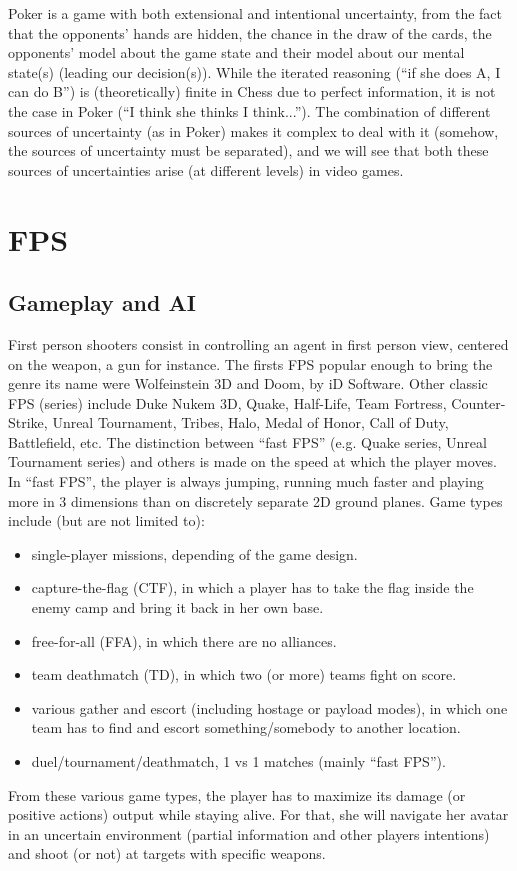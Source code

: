 Poker is a game with both extensional and intentional uncertainty, from the fact that the opponents' hands are hidden, the chance in the draw of the cards, the opponents' model about the game state and their model about our mental state(s) (leading our decision(s)). While the iterated reasoning (``if she does A, I can do B'') is (theoretically) finite in Chess due to perfect information, it is not the case in Poker (``I think she thinks I think...''). The combination of different sources of uncertainty (as in Poker) makes it complex to deal with it (somehow, the sources of uncertainty must be separated), and we will see that both these sources of uncertainties arise (at different levels) in video games.


\section{FPS}

\subsection{Gameplay and AI}
First person shooters  consist in controlling an agent in first person view, centered on the weapon, a gun for instance. The firsts FPS popular enough to bring the genre its name were Wolfeinstein 3D and Doom, by iD Software. Other classic FPS (series) include Duke Nukem 3D, Quake, Half-Life, Team Fortress, Counter-Strike, Unreal Tournament, Tribes, Halo, Medal of Honor, Call of Duty, Battlefield, etc. The distinction between ``fast FPS'' (e.g. Quake series, Unreal Tournament series) and others is made on the speed at which the player moves. In ``fast FPS'', the player is always jumping, running much faster and playing more in 3 dimensions than on discretely separate 2D ground planes. Game types include (but are not limited to):
\begin{itemize}
    \item single-player missions, depending of the game design.
    \item capture-the-flag (CTF), in which a player has to take the flag inside the enemy camp and bring it back in her own base.
    \item free-for-all (FFA), in which there are no alliances.
    \item team deathmatch (TD), in which two (or more) teams fight on score.
    \item various gather and escort (including hostage or payload modes), in which one team has to find and escort something/somebody to another location.
    \item duel/tournament/deathmatch, 1 vs 1 matches (mainly ``fast FPS'').
\end{itemize}
From these various game types, the player has to maximize its damage (or positive actions) output while staying alive. For that, she will navigate her avatar in an uncertain environment (partial information and other players intentions) and shoot (or not) at targets with specific weapons.

